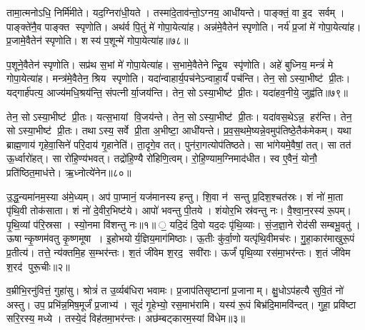 तामा॒त्मनोऽधि॒ निर्मि॑मीते। यद॒ग्निरा॑धी॒यते। तस्मा॑दे॒ताव॑न्तो॒ऽग्नय॒ आधी॑यन्ते। पाङ्क्तं॒ वा इ॒द सर्वम्। पाङ्क्ते॑नै॒व पाङ्क्त स्पृणोति। अथ॑र्व पि॒तुं मे॑ गोपा॒येत्या॑ह। अन्न॑मे॒वैतेन॑ स्पृणोति। नर्य॑ प्र॒जां मे॑ गोपा॒येत्या॑ह। प्र॒जामे॒वैतेन॑ स्पृणोति। शस्य॑ प॒शून्मे॑ गोपा॒येत्या॑ह॥७८॥

प॒शूने॒वैतेन॑ स्पृणोति। सप्र॑थ स॒भां मे॑ गोपा॒येत्या॑ह। स॒भामे॒वैतेनेन्द्रि॒य स्पृ॑णोति। अहे॑ बुध्निय॒ मन्त्रं॑ मे गोपा॒येत्या॑ह। मन्त्र॑मे॒वैतेन॒ श्रिय स्पृणोति। यदा॑न्वाहार्य॒पच॑नेऽन्वाहा॒र्यं॑ पच॑न्ति। तेन॒ सोऽस्या॒भीष्ट॑ प्री॒तः। यद्गार्\mbox{}ह॑पत्य॒ आज्य॑मधि॒श्रय॑न्ति॒ संपत्नीर्या॒जय॑न्ति। तेन॒ सोऽस्या॒भीष्ट॑ प्री॒तः। यदा॑हव॒नीये॒ जुह्व॑ति॥७९॥

तेन॒ सोऽस्या॒भीष्ट॑ प्री॒तः। यत्स॒भायां वि॒जय॑न्ते। तेन॒ सोऽस्या॒भीष्ट॑ प्री॒तः। यदा॑वस॒थेऽन्न॒ हर॑न्ति। तेन॒ सोऽस्या॒भीष्ट॑ प्री॒तः। तथाऽस्य॒ सर्वे प्री॒ता अ॒भीष्टा॒ आधी॑यन्ते। प्र॒व॒स॒थमे॒ष्यन्ने॒वमुप॑तिष्ठे॒तैक॑मेकम्। यथा ब्राह्म॒णाय॑ गृहेवा॒सिने॑ परि॒दाय॑ गृ॒हानेति॑। ता॒दृगे॒व तत्। पुन॑रा॒गत्योप॑तिष्ठते। सा भा॑गेयमे॒वैषां॒ तत्। सा तत॑ ऊ॒र्ध्वारो॑हत्। सा रो॑हि॒ण्य॑भवत्। तद्रो॑हि॒ण्यै रो॑हिणि॒त्वम्। रो॒हि॒ण्याम॒ग्निमाद॑धीत। स्व ए॒वैनं॒ योनौ॒ प्रति॑ष्ठित॒माध॑त्ते। ऋ॒ध्नोत्ये॑नेन॥८०॥\anuvakamend[ए॒षा प॒शून्मे॑ गोपा॒येति॒ प्रवि॑ष्टा प॒शून्मे॑ गोपा॒येत्या॑ह॒ जुह्व॑ति तिष्ठते स॒प्त च॑॥१०॥]




\clearpage
{}
\setcounter{anuvakam}{0}
उ॒द्ध॒न्यमा॑नम॒स्या अ॑मे॒ध्यम्। अप॑ पा॒प्मानं॒ यज॑मानस्य हन्तु। शि॒वा न॑ सन्तु प्र॒दिश॒श्चत॑स्रः। शं नो॑ मा॒ता पृ॑थि॒वी तोक॑साता। शं नो॑ दे॒वीर॒भिष्ट॑ये। आपो॑ भवन्तु पी॒तये। शंयोर॒भि स्र॑वन्तु नः। वै॒श्वा॒न॒रस्य॑ रू॒पम्। पृ॒थि॒व्यां प॑रि॒स्रसा। स्यो॒नमा वि॑शन्तु नः॥१॥
॒॒
यदि॒दं दि॒वो यद॒दः पृ॑थि॒व्याः। सं॒ज॒ज्ञा॒ने रोद॑सी सम्बभू॒वतु॑। ऊषान्कृ॒ष्णम॑वतु कृ॒ष्णमूषा। इ॒होभयोर्य॒ज्ञिय॒माग॑मिष्ठाः। ऊ॒तीः कु॑र्वा॒णो यत्पृ॑थि॒वीमच॑रः। गु॒हा॒कार॑माखुरू॒पं प्र॒तीत्य॑। तत्ते॒ न्य॑क्तमि॒ह स॒म्भर॑न्तः। श॒तं जी॑वेम श॒रद॒ सवी॑राः। ऊर्जं॑ पृथि॒व्या रस॑मा॒भर॑न्तः। श॒तं जी॑वेम श॒रद॑ पुरू॒चीः॥२॥

व॒म्रीभि॒रनु॑वित्तं॒ गुहा॑सु। श्रोत्रं॑ त उ॒र्व्यब॑धिरा भवामः। प्र॒जाप॑तिसृष्टानां प्र॒जानाम्। क्षु॒धोऽप॑हत्यै सुवि॒तं नो॑ अस्तु। उप॒ प्रभि॑न्न॒मिष॒मूर्जं॑ प्र॒जाभ्य॑। सूदं॑ गृ॒हेभ्यो॒ रस॒माभ॑रामि। यस्य॑ रू॒पं बिभ्र॑दि॒मामवि॑न्दत्। गुहा॒ प्रवि॑ष्टा सरि॒रस्य॒ मध्ये। तस्ये॒दं विह॑तमा॒भर॑न्तः। अछ॑म्बट्कारम॒स्यां वि॑धेम॥३॥

